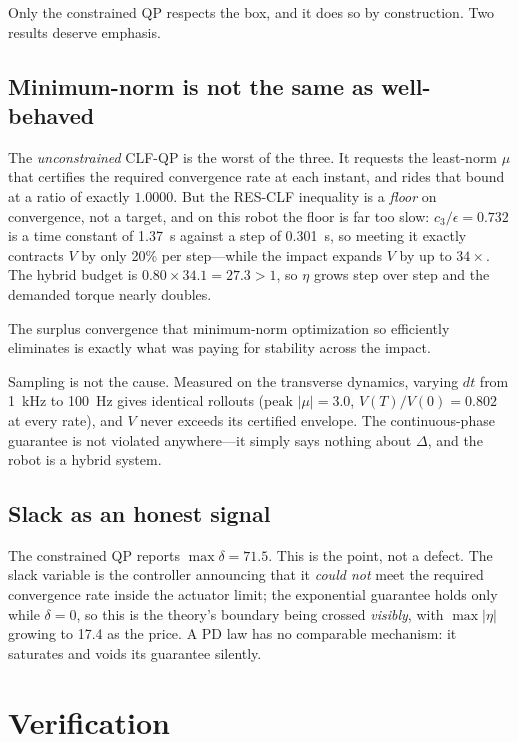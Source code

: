 \documentclass[10pt,conference]{IEEEtran}
\begin{document}
Only the constrained QP respects the box, and it does so by construction. Two
results deserve emphasis.

\subsection{Minimum-norm is not the same as well-behaved}

The \emph{unconstrained} CLF-QP is the worst of the three. It requests the
least-norm $\mu$ that certifies the required convergence rate at each instant,
and rides that bound at a ratio of exactly $1.0000$. But the RES-CLF inequality
is a \emph{floor} on convergence, not a target, and on this robot the floor is
far too slow: $c_3/\epsilon = 0.732$ is a time constant of 1.37~s against a step
of 0.301~s, so meeting it exactly contracts $V$ by only 20\% per step---while
the impact expands $V$ by up to $34\times$. The hybrid budget is
$0.80 \times 34.1 = 27.3 > 1$, so $\eta$ grows step over step and the demanded
torque nearly doubles.

The surplus convergence that minimum-norm optimization so efficiently eliminates
is exactly what was paying for stability across the impact.

Sampling is not the cause. Measured on the transverse dynamics, varying $dt$
from 1~kHz to 100~Hz gives identical rollouts (peak $|\mu| = 3.0$,
$V(T)/V(0) = 0.802$ at every rate), and $V$ never exceeds its certified
envelope. The continuous-phase guarantee is not violated anywhere---it simply
says nothing about $\Delta$, and the robot is a hybrid system.

\subsection{Slack as an honest signal}

The constrained QP reports $\max\delta = 71.5$. This is the point, not a defect.
The slack variable is the controller announcing that it \emph{could not} meet
the required convergence rate inside the actuator limit; the exponential
guarantee holds only while $\delta = 0$, so this is the theory's boundary being
crossed \emph{visibly}, with $\max|\eta|$ growing to 17.4 as the price. A PD law
has no comparable mechanism: it saturates and voids its guarantee silently.

\section{Verification}
\end{document}
